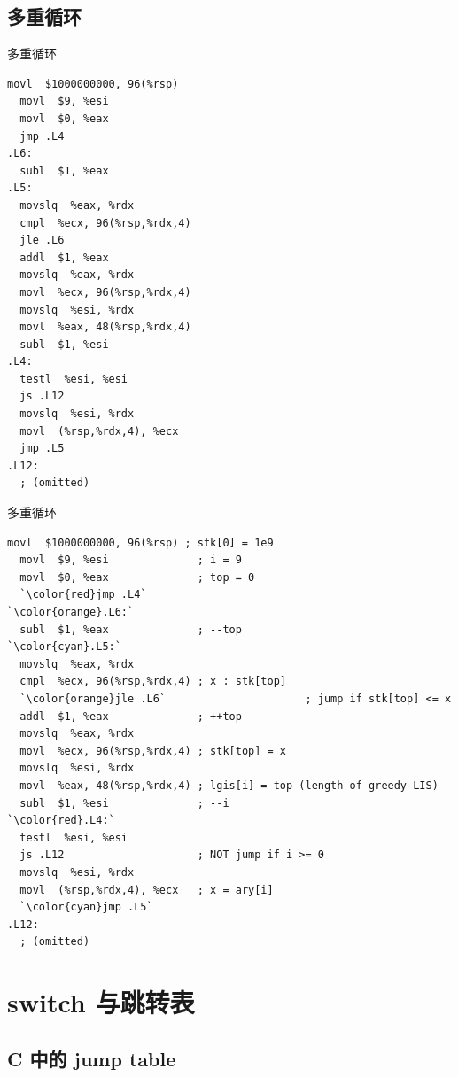 \documentclass{ctexbeamer}
\begin{document}
\subsection*{多重循环}

\begin{frame}[fragile, shrink=35]{多重循环}
  \begin{lstlisting}[language=x86_64]
  movl  $1000000000, 96(%rsp)
  movl  $9, %esi
  movl  $0, %eax
  jmp .L4
.L6:
  subl  $1, %eax
.L5:
  movslq  %eax, %rdx
  cmpl  %ecx, 96(%rsp,%rdx,4)
  jle .L6
  addl  $1, %eax
  movslq  %eax, %rdx
  movl  %ecx, 96(%rsp,%rdx,4)
  movslq  %esi, %rdx
  movl  %eax, 48(%rsp,%rdx,4)
  subl  $1, %esi
.L4:
  testl  %esi, %esi
  js .L12
  movslq  %esi, %rdx
  movl  (%rsp,%rdx,4), %ecx
  jmp .L5
.L12:
  ; (omitted)
  \end{lstlisting}
\end{frame}

\begin{frame}[fragile, shrink=30]{多重循环}
  \begin{lstlisting}[language=x86_64]
  movl  $1000000000, 96(%rsp) ; stk[0] = 1e9
  movl  $9, %esi              ; i = 9
  movl  $0, %eax              ; top = 0
  `\color{red}jmp .L4`
`\color{orange}.L6:`
  subl  $1, %eax              ; --top
`\color{cyan}.L5:`
  movslq  %eax, %rdx
  cmpl  %ecx, 96(%rsp,%rdx,4) ; x : stk[top]
  `\color{orange}jle .L6`                      ; jump if stk[top] <= x
  addl  $1, %eax              ; ++top
  movslq  %eax, %rdx
  movl  %ecx, 96(%rsp,%rdx,4) ; stk[top] = x
  movslq  %esi, %rdx
  movl  %eax, 48(%rsp,%rdx,4) ; lgis[i] = top (length of greedy LIS)
  subl  $1, %esi              ; --i
`\color{red}.L4:`
  testl  %esi, %esi
  js .L12                     ; NOT jump if i >= 0
  movslq  %esi, %rdx
  movl  (%rsp,%rdx,4), %ecx   ; x = ary[i]
  `\color{cyan}jmp .L5`
.L12:
  ; (omitted)
  \end{lstlisting}
\end{frame}

\section{switch 与跳转表}

\subsection*{C 中的 jump table}
\end{document}
